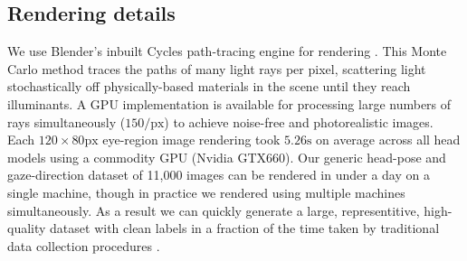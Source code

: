 \subsection{Rendering details}

We use Blender's inbuilt Cycles path-tracing engine for rendering .
This Monte Carlo method traces the paths of many light rays per pixel, scattering light stochastically off physically-based materials in the scene until they reach illuminants.
A GPU implementation is available for processing large numbers of rays simultaneously ($150/\textrm{px}$) to achieve noise-free and photorealistic images.
Each $120\!\times\!80\textrm{px}$ eye-region image rendering took $5.26\textrm{s}$ on average across all head models using a commodity GPU (Nvidia GTX660).
Our generic head-pose and gaze-direction dataset of 11,000 images can be rendered in under a day on a single machine, though in practice we rendered using multiple machines simultaneously.
As a result we can quickly generate a large, representitive, high-quality dataset with clean labels in a fraction of the time taken by traditional data collection procedures \cite{zhang15_cvpr} .